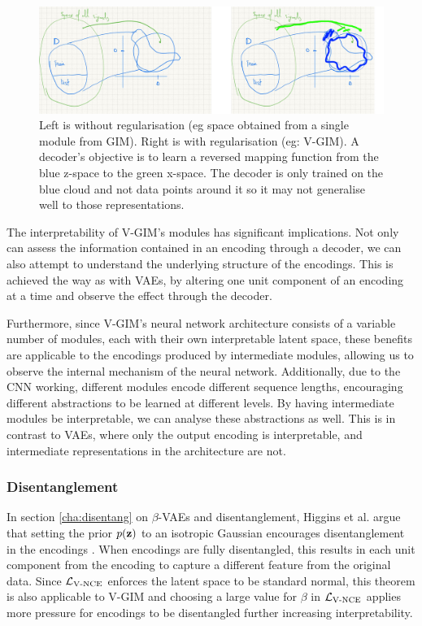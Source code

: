 		\begin{figure} %
			\centering
			\includegraphics[width=0.7\linewidth]{"no regularisation"}
			\caption{Left is without regularisation (eg space obtained from a single module from GIM). Right is with regularisation (eg: V-GIM). A decoder's objective is to learn a reversed mapping function from the blue z-space to the green x-space. The decoder is only trained on the blue cloud and not data points around it so it may not generalise well to those representations. }
			\label{fig:no-regularisation}
		\end{figure}
	
		The interpretability of V-GIM's modules has significant implications. Not only can assess the information contained in an encoding through a decoder, we can also attempt to understand the underlying structure of the encodings. This is achieved the way as with VAEs, by altering one unit component of an encoding at a time and observe the effect through the decoder.
		
		Furthermore, since V-GIM's neural network architecture consists of a variable number of modules, each with their own interpretable latent space, these benefits are applicable to the encodings produced by intermediate modules, allowing us to observe the internal mechanism of the neural network. Additionally, due to the CNN working, different modules encode different sequence lengths, encouraging different abstractions to be learned at different levels. By having intermediate modules be interpretable, we can analyse these abstractions as well. This is in contrast to VAEs, where only the output encoding is interpretable, and intermediate representations in the architecture are not.

						
	\subsubsection{Disentanglement}
		In section \ref{cha:disentang} on $\beta$-VAEs and disentanglement, Higgins et al. argue that setting the prior $p(\mathbf{z})$ to an isotropic Gaussian encourages disentanglement in the encodings \cite{higginsBetaVAELearningBasic2022}. When encodings are fully disentangled, this results in each unit component from the encoding to capture a different feature from the original data. Since $\mathcal{L}_{\text{V-NCE}}$ enforces the latent space to be standard normal, this theorem is also applicable to V-GIM and choosing a large value for $\beta$ in $\mathcal{L}_{\text{V-NCE}}$ applies more pressure for encodings to be disentangled further increasing interpretability.
		
